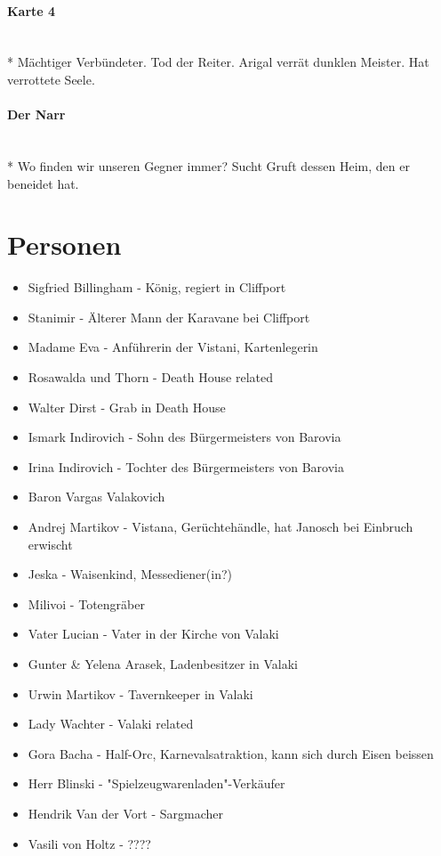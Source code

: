 \documentclass{article}
\begin{document}
\paragraph{Karte 4} ~\\*
Mächtiger Verbündeter. Tod der Reiter. Arigal verrät dunklen Meister. Hat verrottete Seele.
\paragraph{Der Narr} ~\\*
Wo finden wir unseren Gegner immer? Sucht Gruft dessen Heim, den er beneidet hat.
\section{Personen}
\begin{itemize}
	\item Sigfried Billingham - König, regiert in Cliffport
	\item Stanimir - Älterer Mann der Karavane bei Cliffport
	\item Madame Eva - Anführerin der Vistani, Kartenlegerin
	\item Rosawalda und Thorn - Death House related
	\item Walter Dirst - Grab in Death House
	\item Ismark Indirovich - Sohn des Bürgermeisters von Barovia
	\item Irina Indirovich - Tochter des Bürgermeisters von Barovia
	\item Baron Vargas Valakovich
	\item Andrej Martikov - Vistana, Gerüchtehändle, hat Janosch bei Einbruch erwischt
	\item Jeska - Waisenkind, Messediener(in?)
	\item Milivoi - Totengräber
	\item Vater Lucian - Vater in der Kirche von Valaki
	\item Gunter \& Yelena Arasek, Ladenbesitzer in Valaki
	\item Urwin Martikov - Tavernkeeper in Valaki
	\item Lady Wachter - Valaki related
	\item Gora Bacha - Half-Orc, Karnevalsatraktion, kann sich durch Eisen beissen
	\item Herr Blinski - "Spielzeugwarenladen"-Verkäufer
	\item Hendrik Van der Vort - Sargmacher 
	\item Vasili von Holtz -  ????
\end{itemize}
\end{document}

